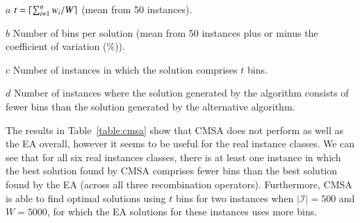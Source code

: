 \documentclass[authoryear]{elsarticle}
\begin{document}
\begin{table}[h!]
\begin{threeparttable}
\begin{tablenotes}
	\scriptsize
	\item[$a$] $t = \lceil\sum_{i=1}^{n} w_i / W\rceil$ (mean from 50 instances).
	\item[$b$] Number of bins per solution (mean from 50 instances plus or minus the coefficient of variation (\%)).
	\item[$c$] Number of instances in which the solution comprises $t$ bins.
	\item[$d$] Number of instances where the solution generated by the algorithm consists of fewer bins than the solution generated by the alternative algorithm.
\end{tablenotes}	
\end{threeparttable}	
\label{table:cmsa}
\end{table}


\noindent The results in Table~\ref{table:cmsa} show that CMSA does not perform as well as the EA overall, however it seems to be useful for the real instance classes. We can see that for all six real instances classes, there is at least one instance in which the best solution found by CMSA comprises fewer bins than the best solution found by the EA (across all three recombination operators). Furthermore, CMSA is able to find optimal solutions using $t$ bins for two instances when $|\mathcal{I}| = 500$ and $W = 5000$, for which the EA solutions for these instances uses more bins. 
\end{document}
